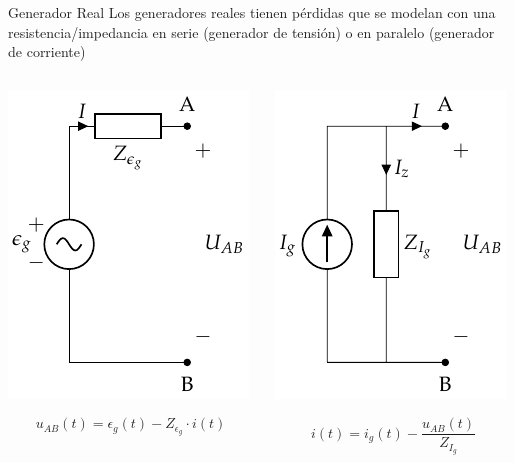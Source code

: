 \documentclass[xcolor={usenames,svgnames,dvipsnames}]{beamer}
\begin{document}
\begin{frame}[label={sec:org5f5e1eb}]{Generador Real}
Los generadores reales tienen pérdidas que se modelan con una resistencia/impedancia en \alert{serie} (generador de tensión) o en \alert{paralelo} (generador de corriente)

\begin{columns}
\begin{column}{0.5\columnwidth}
\begin{center}
\includegraphics[height=0.5\textheight]{figs/FuenteTensionReal.pdf}
\end{center}
\[
  u_{AB}(t) = \epsilon_g(t) - Z_{\epsilon_g} \cdot i(t)
\]
\end{column}
\begin{column}{0.5\columnwidth}
\begin{center}
\includegraphics[height=0.5\textheight]{figs/FuenteCorrienteReal.pdf}
\end{center}
\[
  i(t) = i_g(t) - \frac{u_{AB}(t)}{Z_{I_g}}
\]
\end{column}
\end{columns}
\end{frame}
\end{document}
